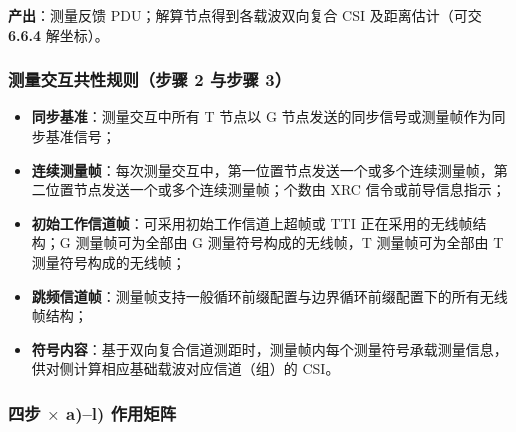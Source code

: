\documentclass[11pt,a4paper]{ctexart}
\begin{document}
\textbf{产出}：测量反馈 PDU；解算节点得到各载波双向复合 CSI 及距离估计（可交 \textbf{6.6.4} 解坐标）。

\subsubsection*{测量交互共性规则（步骤 2 与步骤 3）}

\begin{itemize}[nosep]
  \item \textbf{同步基准}：测量交互中所有 T 节点以 G 节点发送的同步信号或测量帧作为同步基准信号；
  \item \textbf{连续测量帧}：每次测量交互中，第一位置节点发送一个或多个连续测量帧，第二位置节点发送一个或多个连续测量帧；个数由 XRC 信令或前导信息指示；
  \item \textbf{初始工作信道帧}：可采用初始工作信道上超帧或 TTI 正在采用的无线帧结构；G 测量帧可为全部由 G 测量符号构成的无线帧，T 测量帧可为全部由 T 测量符号构成的无线帧；
  \item \textbf{跳频信道帧}：测量帧支持一般循环前缀配置与边界循环前缀配置下的所有无线帧结构；
  \item \textbf{符号内容}：基于双向复合信道测距时，测量帧内每个测量符号承载测量信息，供对侧计算相应基础载波对应信道（组）的 CSI。
\end{itemize}

\subsubsection*{四步 $\times$ a)--l) 作用矩阵}
\end{document}

